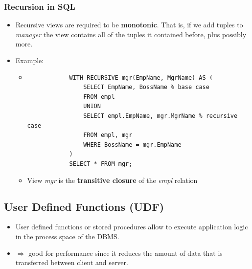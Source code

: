 \subsubsection{Recursion in SQL}
\begin{itemize}
    \item Recursive views are required to be \textbf{monotonic}. That is, if we add tuples to \textit{manager} the view contains all of the tuples it contained before, plus possibly more.
    \item Example:
    \begin{itemize}
        \item[] \begin{lstlisting}
            WITH RECURSIVE mgr(EmpName, MgrName) AS (
                SELECT EmpName, BossName % base case
                FROM empl
                UNION
                SELECT empl.EmpName, mgr.MgrName % recursive case
                FROM empl, mgr
                WHERE BossName = mgr.EmpName
            )
            SELECT * FROM mgr;
        \end{lstlisting}
        \item View \textit{mgr} is the \textbf{transitive closure} of the \textit{empl} relation
    \end{itemize}
\end{itemize}


\subsection{User Defined Functions (UDF)}
\begin{itemize}
    \item User defined functions or stored procedures allow to execute application logic in the process space of the DBMS.
    \item $\Rightarrow$ good for performance since it reduces the amount of data that is transferred between client and server.
\end{itemize}


